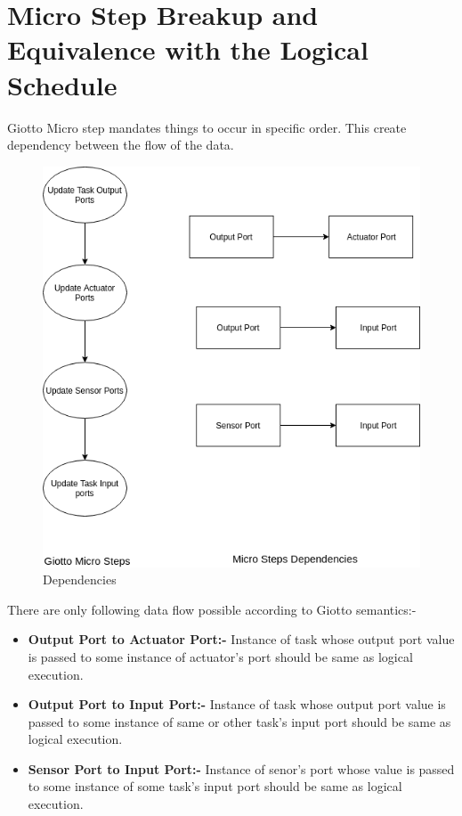 \documentclass[16pt]{report}
\begin{document}
\section{Micro Step Breakup and Equivalence with the Logical Schedule}
Giotto Micro step mandates things to occur in specific order. This create dependency between the flow of the data. 
\begin{figure}[H]
\centering
\includegraphics[width=\linewidth]{20MicroDepen.png}
\caption{Dependencies}
\end{figure}
There are only following data flow possible according to Giotto semantics:-
\begin{itemize}
    \item \textbf{Output Port to Actuator Port:-} Instance of task whose output port value is passed to some instance of actuator's port should be same as logical execution.
    \item \textbf{Output Port to Input Port:-} Instance of task whose output port value is passed to some instance of same or other task's input port should be same as logical execution.
    \item \textbf{Sensor Port to Input Port:-} Instance of senor's port whose value is passed to some instance of some task's input port should be same as logical execution.
\end{itemize}
\end{document}
